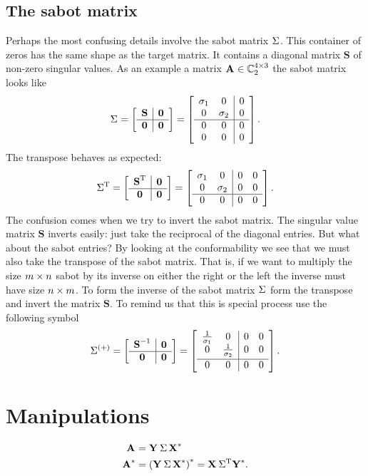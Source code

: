 \subsection{The sabot matrix}
Perhaps the most confusing details involve the sabot matrix $\sig{}$. This container of zeros has the same shape as the target matrix. It contains a diagonal matrix $\textbf{S}$ of non-zero singular values. As an example a matrix $\A{}\in\cmplx{\by{4}{3}}_{2}$ the sabot matrix looks like
\begin{equation}
  \sig{} = \mat{c|c}{\textbf{S} & \zero \\\hline \zero & \zero} = 
  \mat{cc|c}{\sigma_{1}&0&0\\0&\sigma_{2}&0\\\hline0&0&0\\0&0&0}.
\end{equation}
The transpose behaves as expected:
\begin{equation}
  \sig{T} = \mat{c|c}{\textbf{S}^{\mathrm{T}} & \zero \\\hline \zero & \zero} = 
  \mat{cc|cc}{\sigma_{1}&0&0&0\\0&\sigma_{2}&0&0\\\hline0&0&0&0}.
\end{equation}
The confusion comes when we try to invert the sabot matrix. The singular value matrix $\textbf{S}$ inverts easily: just take the reciprocal of the diagonal entries. But what about the sabot entries? By looking at the conformability we see that we must also take the transpose of the sabot matrix. That is, if we want to multiply the size $\by{m}{n}$ sabot by its inverse on either the right or the left the inverse must have size $\by{n}{m}$. To form the inverse of the sabot matrix $\sig{}$ form the transpose and invert the matrix $\textbf{S}$. To remind us that this is special process use the following symbol
\begin{equation}
  \sig{(+)} = \mat{c|c}{\textbf{S}^{-1} & \zero \\\hline \zero & \zero} = 
  \mat{cc|cc}{\frac{1}{\sigma_{1}}&0&0&0\\0&\frac{1}{\sigma_{2}}&0&0\\[3pt]\hline0&0&0&0}.
\end{equation}

\section{Manipulations}
\begin{equation}
  \begin{split}
    \svda{*}\\
    \A{*}&=\paren{\svd{*}}^{*}=\X{}\,\sig{T}\Y{*}.
  \end{split}
\end{equation}

